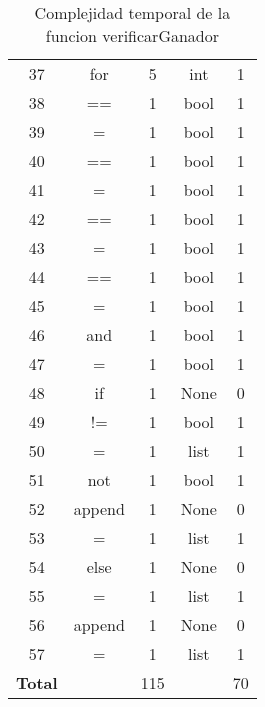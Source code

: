 \documentclass[10pt,twocolumn]{article}
\begin{document}
\begin{table}[h]
\begin{tabular}{|c|c|c|c|c|}
37 & for & 5 & int & 1 \\
38 & == & 1 & bool & 1 \\
39 & = & 1 & bool & 1 \\
40 & == & 1 & bool & 1 \\
41 & = & 1 & bool & 1 \\
42 & == & 1 & bool & 1 \\
43 & = & 1 & bool & 1 \\
44 & == & 1 & bool & 1 \\
45 & = & 1 & bool & 1 \\
46 & and & 1 & bool & 1 \\
47 & = & 1 & bool & 1 \\
48 & if & 1 & None & 0 \\
49 & != & 1 & bool & 1 \\
50 & = & 1 & list & 1 \\
51 & not & 1 & bool & 1 \\
52 & append & 1 & None & 0 \\
53 & = & 1 & list & 1 \\
54 & else & 1 & None & 0 \\
55 & = & 1 & list & 1 \\
56 & append & 1 & None & 0 \\
57 & = & 1 & list & 1 \\

\hline
\textbf{Total} &  & 115 &  & 70 \\
\hline
\end{tabular}
\caption{Complejidad temporal de la funcion verificarGanador}
\label{tablaComplejidadVerificarGanador}
\end{table}




\end{document}
